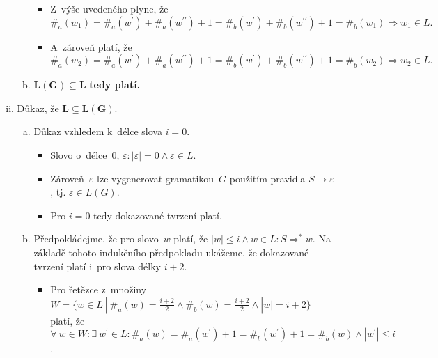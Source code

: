 \documentclass[a4paper, 11pt]{scrartcl}
\begin{document}
\begin{enumerate}[(a)]
\begin{enumerate}[i)]
\begin{enumerate}[a)]
\begin{itemize}[label=$ \bullet $]
								\item
									Z~výše uvedeného plyne, že $ \#_a(w_1)
									= \#_a(w^\prime) + \#_a(w^{\prime\prime})
									+ 1 = \#_b(w^\prime) + \#_b(w^{\prime
									\prime}) + 1 = \#_b(w_1) \Rightarrow
									w_1 \in L. $

								\item
									A~zároveň platí, že $ \#_a(w_2)
									= \#_a(w^\prime) + \#_a(w^{\prime\prime})
									+ 1 = \#_b(w^\prime) + \#_b(w^{\prime
									\prime}) + 1 = \#_b(w_2) \Rightarrow
									w_2 \in L. $
							\end{itemize}

						\item
							$ \boldsymbol{L(G) \subseteq L} $ \textbf{tedy
							platí.}
					\end{enumerate}

				\item
					Důkaz, že $ \boldsymbol{L \subseteq L(G)} $.

					\begin{enumerate}[a)]
						\item
							Důkaz vzhledem k~délce slova $ i = 0 $.

							\begin{itemize}[label=$ \bullet $]
								\item
									Slovo o~délce~$ 0 $, $ \varepsilon:
									|\varepsilon| = 0 \wedge \varepsilon
									\in L $.

								\item
									Zároveň~$ \varepsilon $ lze vygenerovat
									gramatikou~$ G $ použitím pravidla $ S
									\rightarrow \varepsilon $, tj.
									$ \varepsilon \in L(G) $.

								\item
									Pro $ i = 0 $ tedy dokazované tvrzení
									platí.
							\end{itemize}

						\item
							Předpokládejme, že pro slovo~$ w $ platí, že
							$ |w| \leq i \wedge w \in L : S \Rightarrow^*
							w $. Na základě tohoto indukčního předpokladu
							ukážeme, že dokazované tvrzení platí i~pro
							slova délky $ i + 2 $.

							\begin{itemize}[label=$ \bullet $]
								\item
									Pro řetězce z~množiny $ W = \{w \in
									L\ |\ \#_a(w) = \frac{i + 2}{2} \wedge
									\#_b(w) = \frac{i + 2}{2} \wedge |w| =
									i + 2\} $ platí, že $ \forall\ w
									\in W : \exists\ w^\prime \in L :
									\#_a(w) = \#_a(w^\prime) + 1 =
									\#_b(w^\prime) + 1 = \#_b(w) \wedge
									|w^\prime| \leq i $.


\end{itemize}
\end{enumerate}
\end{enumerate}
\end{enumerate}
\end{document}
